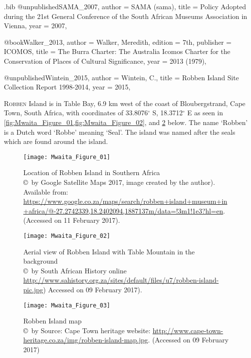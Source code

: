 \begin{filecontents}{\IJSRAidentifier.bib}
@unpublished{SAMA_2007,
	author = {SAMA (sama)},
	title = {Policy Adopted during the 21st General Conference of the South African Museums Association in Vienna},
	year = {2007},
}

@book{Walker_2013,
	author = {Walker, Meredith},
	edition = {7th},
	publisher = {ICOMOS},
	title = {The Burra Charter: The Australia Icomos Charter for the Conservation of Places of Cultural Significance},
	year = {2013 (1979)},
}

@unpublished{Wintein_2015,
	author = {Wintein, C.},
	title = {Robben Island Site Collection Report 1998-2014},
	year = {2015},
}
\end{filecontents}
\IJSRAopening%
\lettrine{R}{obben} Island is in Table Bay, 6.9 km west of the coast of Bloubergstrand, Cape Town, South Africa, with coordinates of 33.8076$^{\circ}$ S, 18.3712$^{\circ}$ E as seen in \cref{fig:Mwaita_Figure_01,fig:Mwaita_Figure_02}, and \cref{fig:Mwaita_Figure_03} below.
The name ‘Robben’ is a Dutch word ‘Robbe’ meaning ‘Seal’. The island was named after the seals which are found around the island.

\begin{figure}[!p]
\begin{minipage}[t]{.49\linewidth}
	\texttt{[image: Mwaita\_Figure\_01]}
	\caption{Location of Robben Island in Southern Africa
  {\normalfont\scriptsize \\ \copyright\ by
                   Google Satellite Maps 2017, image created by the author). Available from: \url{https://www.google.co.za/maps/search/robben+island+museum+in+africa/@-27.2742339,18.2402094,1887137m/data=!3m1!1e3?hl=en}. (Accessed on 11 February 2017).
                    }}
	\label{fig:Mwaita_Figure_01}
\end{minipage}\hfill
\begin{minipage}[t]{.49\linewidth}
	\texttt{[image: Mwaita\_Figure\_02]}
	\caption{Aerial view of Robben Island with Table Mountain in the background
  {\normalfont\scriptsize \\ \copyright\ by
      South African History online \url{http://www.sahistory.org.za/sites/default/files/u7/robben-island-pic.jpg}) Accessed on 09 February 2017).
                    }}
	\label{fig:Mwaita_Figure_02}
\end{minipage}
\end{figure}

\begin{figure}[!p]
	\texttt{[image: Mwaita\_Figure\_03]}
	\caption{Robben Island map
  {\normalfont\scriptsize \\ \copyright\ by
                    Source:  Cape Town heritage website: \url{http://www.cape-town-heritage.co.za/img/robben-island-map.jpg}. (Accessed on 09 February 2017)
                    }}
	\label{fig:Mwaita_Figure_03}
\end{figure}



